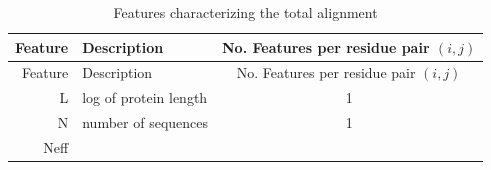 \documentclass[11pt,a4paper,twoside]{book}
\theoremstyle{definition}
\theoremstyle{definition}
\theoremstyle{remark}
\begin{document}
\begin{longtable}[]{@{}rlc@{}}
\caption{\label{tab:global-features} Features characterizing the total
alignment}\tabularnewline
\toprule
\begin{minipage}[b]{0.23\columnwidth}\raggedleft\strut
Feature\strut
\end{minipage} & \begin{minipage}[b]{0.50\columnwidth}\raggedright\strut
Description\strut
\end{minipage} & \begin{minipage}[b]{0.18\columnwidth}\centering\strut
No. Features per residue pair \((i, j)\)\strut
\end{minipage}\tabularnewline
\midrule
\endfirsthead
\toprule
\begin{minipage}[b]{0.23\columnwidth}\raggedleft\strut
Feature\strut
\end{minipage} & \begin{minipage}[b]{0.50\columnwidth}\raggedright\strut
Description\strut
\end{minipage} & \begin{minipage}[b]{0.18\columnwidth}\centering\strut
No. Features per residue pair \((i, j)\)\strut
\end{minipage}\tabularnewline
\midrule
\endhead
\begin{minipage}[t]{0.23\columnwidth}\raggedleft\strut
L\strut
\end{minipage} & \begin{minipage}[t]{0.50\columnwidth}\raggedright\strut
log of protein length\strut
\end{minipage} & \begin{minipage}[t]{0.18\columnwidth}\centering\strut
1\strut
\end{minipage}\tabularnewline
\begin{minipage}[t]{0.23\columnwidth}\raggedleft\strut
N\strut
\end{minipage} & \begin{minipage}[t]{0.50\columnwidth}\raggedright\strut
number of sequences\strut
\end{minipage} & \begin{minipage}[t]{0.18\columnwidth}\centering\strut
1\strut
\end{minipage}\tabularnewline
\begin{minipage}[t]{0.23\columnwidth}\raggedleft\strut
Neff\strut
\end{minipage} & \begin{minipage}[t]{0.50\columnwidth}\raggedright\strut

\end{minipage}
\end{longtable}
\end{document}

